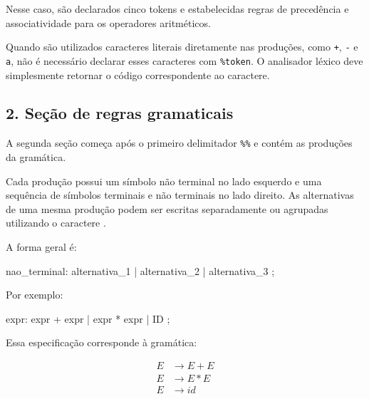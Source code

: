 \documentclass[
  brazilian,
  letterpaper,
]{book}
\newenvironment{Shaded}{\begin{snugshade}}{\end{snugshade}}
\newcommand{\NormalTok}[1]{\textcolor[rgb]{0.00,0.23,0.31}{#1}}
\theoremstyle{plain}
\theoremstyle{definition}
\theoremstyle{remark}
\begin{document}
Nesse caso, são declarados cinco tokens e estabelecidas regras de
precedência e associatividade para os operadores aritméticos.

Quando são utilizados caracteres literais diretamente nas produções,
como \texttt{\textquotesingle{}+\textquotesingle{}},
\texttt{\textquotesingle{}-\textquotesingle{}} e
\texttt{\textquotesingle{}a\textquotesingle{}}, não é necessário
declarar esses caracteres com \texttt{\%token}. O analisador léxico deve
simplesmente retornar o código correspondente ao caractere.

\subsection{2. Seção de regras
gramaticais}\label{seuxe7uxe3o-de-regras-gramaticais}

A segunda seção começa após o primeiro delimitador \texttt{\%\%} e
contém as produções da gramática.

Cada produção possui um símbolo não terminal no lado esquerdo e uma
sequência de símbolos terminais e não terminais no lado direito. As
alternativas de uma mesma produção podem ser escritas separadamente ou
agrupadas utilizando o caractere \texttt{\textbar{}}.

A forma geral é:

\begin{Shaded}
\begin{Highlighting}[]
\NormalTok{nao\_terminal:}
\NormalTok{      alternativa\_1}
\NormalTok{    | alternativa\_2}
\NormalTok{    | alternativa\_3}
\NormalTok{    ;}
\end{Highlighting}
\end{Shaded}

Por exemplo:

\begin{Shaded}
\begin{Highlighting}[]
\NormalTok{expr:}
\NormalTok{      expr \textquotesingle{}+\textquotesingle{} expr}
\NormalTok{    | expr \textquotesingle{}*\textquotesingle{} expr}
\NormalTok{    | ID}
\NormalTok{    ;}
\end{Highlighting}
\end{Shaded}

Essa especificação corresponde à gramática:

\[
\begin{aligned}
E &\rightarrow E+E\\
E &\rightarrow E*E\\
E &\rightarrow id
\end{aligned}
\]
\end{document}
